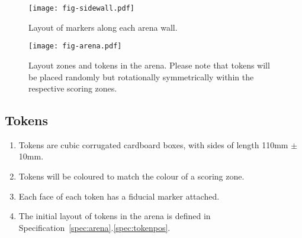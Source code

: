 \begin{sidewaysfigure}
  \texttt{[image: fig-sidewall.pdf]}
  \caption{Layout of markers along each arena wall.}
  \label{fig:sidewall}
\end{sidewaysfigure}

\begin{figure}
  \texttt{[image: fig-arena.pdf]}
  \caption{Layout zones and tokens in the arena. Please note that tokens will
  be placed randomly but rotationally symmetrically within the respective
  scoring zones.}
  \label{fig:arena}
\end{figure}

\subsection{Tokens}
\label{spec:tokens}

\begin{enumerate}
  \item Tokens are cubic corrugated cardboard boxes, with sides of length
        \si{110}{mm} $\pm$ \si{10}{mm}.
  \item Tokens will be coloured to match the colour of a scoring zone.
  \item Each face of each token has a fiducial marker attached.
  \item The initial layout of tokens in the arena is defined in
        Specification~\ref{spec:arena}.\ref{spec:tokenpos}.
\end{enumerate}
